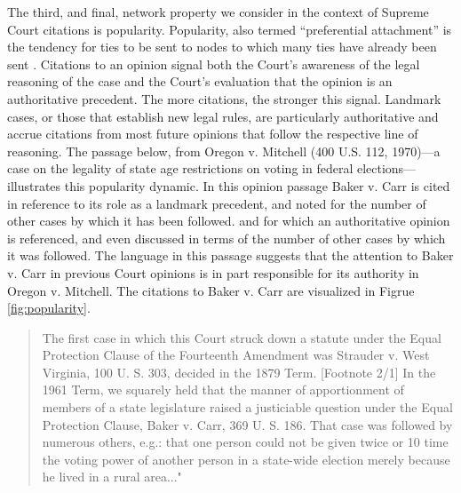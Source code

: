\documentclass{cup-pan}
\begin{document}
The third, and final, network property we consider in the context of Supreme Court citations is popularity. Popularity, also termed ``preferential attachment'' is the tendency for ties to be sent to nodes to which many ties have already been sent \citep{barabasi1999emergence,chayes2013mathematics}. Citations to an opinion signal both the Court's awareness of the legal reasoning of the case and the Court's evaluation that the opinion is an authoritative precedent. The more citations, the stronger this signal. Landmark cases, or those that establish new legal rules, are particularly authoritative and accrue citations from most future opinions that follow the respective line of reasoning. The passage below, from Oregon v. Mitchell (400 U.S. 112, 1970)---a case on the legality of state age restrictions on voting in federal elections---illustrates this popularity dynamic. In this opinion passage Baker v. Carr is cited in reference to its role as a landmark precedent, and noted for the number of other cases by which it has been followed. and for which an authoritative opinion is referenced, and even discussed in terms of the number of other cases by which it was followed. The language in this passage suggests that the attention to Baker v. Carr in previous Court opinions is in part responsible for its authority in Oregon v. Mitchell. The citations to Baker v. Carr are visualized in Figrue \ref{fig:popularity}.
\begin{quotation}
The first case in which this Court struck down a statute under the Equal Protection Clause of the Fourteenth Amendment was Strauder v. West Virginia, 100 U. S. 303, decided in the 1879 Term. [Footnote 2/1] In the 1961 Term, we squarely held that the manner of apportionment of members of a state legislature raised a justiciable question under the Equal Protection Clause, Baker v. Carr, 369 U. S. 186. That case was followed by numerous others, e.g.: that one person could not be given twice or 10 time the voting power of another person in a state-wide election merely because he lived in a rural area..."
\end{quotation} %
\end{document}
